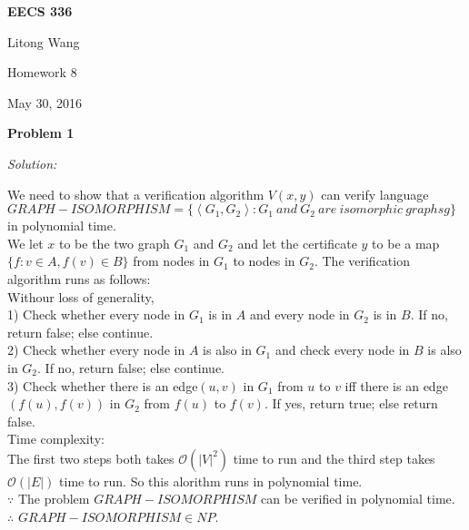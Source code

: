 \documentclass[12pt,letterpaper]{article}
\def\pp{\par\noindent}
\newcommand{\problem}[1]{ \bigskip \pp \textbf{Problem #1}\par}
\newcommand{\solution}{\textit{Solution:}\par}
\begin{document}
\centerline{\bf EECS 336}

\medskip
\centerline{Litong Wang}
\centerline{Homework 8}
\centerline{May 30, 2016}
\bigskip


\problem{1}
\solution
We need to show that a verification algorithm $V(x,y)$ can verify
language $GRAPH-ISOMORPHISM = \{ \left \langle G_1, G_2 \right \rangle : G_1\ and\ G_2\ are\ isomorphic\ graphsg\}$
in polynomial time. \\
We let $x$ to be the two graph $G_1$ and $G_2$ and let the certificate $y$ to be a map $\{ f: v \in A, f(v) \in B \}$ from nodes in $G_1$ to nodes in $G_2$.
The verification algorithm runs as follows: \\
Withour loss of generality, \\
1) Check whether every node in $G_1$ is in $A$ and every node in $G_2$ is in $B$. If no, return false; else continue. \\
2) Check whether every node in $A$ is also in $G_1$ and check every node in $B$ is also in $G_2$. If no, return false; else continue. \\
3) Check whether there is an edge$(u,v)$ in $G_1$ from $u$ to $v$ iff there is an edge$(f(u),f(v))$ in $G_2$ from $f(u)$ to $f(v)$. If yes, return true; else return false. \\
Time complexity: \\
The first two steps both takes $\mathcal{O}(|V|^2)$ time to run and the third step takes $\mathcal{O}(|E|)$ time to run.
So this alorithm runs in polynomial time. \\
$\because$ The problem $GRAPH-ISOMORPHISM$ can be verified in polynomial time. \\
$\therefore$ $GRAPH-ISOMORPHISM \in NP$.
\end{document}
